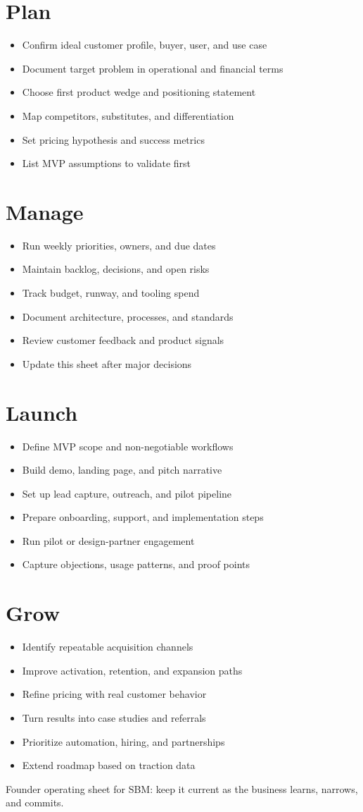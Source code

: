 \documentclass[10pt]{article}
\newcommand{\checkitem}[1]{\item[$\square$] #1}
\begin{document}
\begin{minipage}[t]{0.49\textwidth}
\section*{Plan}
\begin{itemize}
    \checkitem{Confirm ideal customer profile, buyer, user, and use case}
    \checkitem{Document target problem in operational and financial terms}
    \checkitem{Choose first product wedge and positioning statement}
    \checkitem{Map competitors, substitutes, and differentiation}
    \checkitem{Set pricing hypothesis and success metrics}
    \checkitem{List MVP assumptions to validate first}
\end{itemize}

\section*{Manage}
\begin{itemize}
    \checkitem{Run weekly priorities, owners, and due dates}
    \checkitem{Maintain backlog, decisions, and open risks}
    \checkitem{Track budget, runway, and tooling spend}
    \checkitem{Document architecture, processes, and standards}
    \checkitem{Review customer feedback and product signals}
    \checkitem{Update this sheet after major decisions}
\end{itemize}
\end{minipage}\hfill
\begin{minipage}[t]{0.49\textwidth}
\section*{Launch}
\begin{itemize}
    \checkitem{Define MVP scope and non-negotiable workflows}
    \checkitem{Build demo, landing page, and pitch narrative}
    \checkitem{Set up lead capture, outreach, and pilot pipeline}
    \checkitem{Prepare onboarding, support, and implementation steps}
    \checkitem{Run pilot or design-partner engagement}
    \checkitem{Capture objections, usage patterns, and proof points}
\end{itemize}

\section*{Grow}
\begin{itemize}
    \checkitem{Identify repeatable acquisition channels}
    \checkitem{Improve activation, retention, and expansion paths}
    \checkitem{Refine pricing with real customer behavior}
    \checkitem{Turn results into case studies and referrals}
    \checkitem{Prioritize automation, hiring, and partnerships}
    \checkitem{Extend roadmap based on traction data}
\end{itemize}
\end{minipage}

\vfill
{\footnotesize Founder operating sheet for SBM: keep it current as the business learns, narrows, and commits.}
\end{document}
